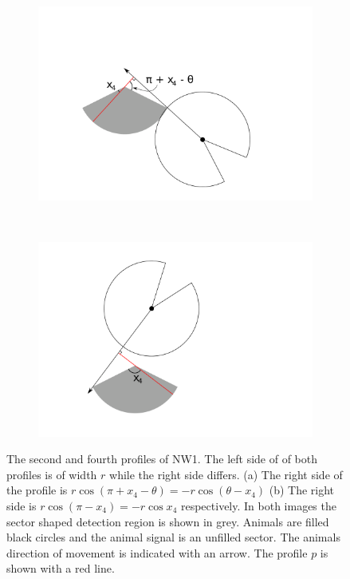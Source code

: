 \begin{figure}[t]
        \centering
        \begin{subfigure}[t]{0.35\textwidth}
                \centering
        \includegraphics[width=1\textwidth, trim=5cm 1cm 4cm 1cm]{imgs/nw2.pdf}
                \caption{}
                \label{f:NW1AT}
        \end{subfigure}
~ 
        \begin{subfigure}[t]{0.35\textwidth}
                \centering
        \includegraphics[width=1\textwidth, trim=0cm 1cm 4cm 1cm]{imgs/nw4.pdf}
                \caption{}
                \label{f:NW1behindFull}
        \end{subfigure}
\caption[The second and fourth profiles of NW1]{The second and fourth profiles of NW1. The left side of of both profiles is of width $r$ while the right side differs. (a) The right side of the profile is $r\cos(\pi+x_4-\theta) = - r\cos(\theta - x_4 )$ (b) The right side is $r\cos(\pi-x_4) = - r\cos x_4$ respectively. In both images the sector shaped detection region is shown in grey. Animals are filled black circles and the animal signal is an unfilled sector. The animals direction of movement is indicated with an arrow. The profile $p$ is shown with a red line. }
\label{f:NW1}
\end{figure}

